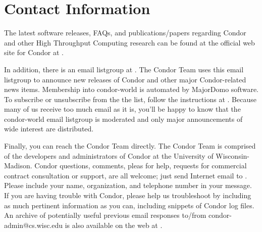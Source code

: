 

\section{\label{contact-info}Contact Information}

The latest software releases, FAQs, and publications/papers regarding Condor and other High 
Throughput Computing research can be found at the official web site for Condor at  
.

In addition, there is an email listgroup at .  The Condor Team 
uses this email listgroup to announce new releases of Condor and other major Condor-related 
news items.  Membership into condor-world is automated by MajorDomo software.  To 
subscribe or unsubscribe from the the list, follow the instructions at  
.  Because many of us receive 
too much email as it is, you'll be happy to know that the condor-world email listgroup is 
moderated and only major announcements of wide interest are distributed.

Finally, you can reach the Condor Team directly.  The Condor Team is comprised of the 
developers and administrators of Condor at the University of Wisconsin-Madison. Condor 
questions, comments, pleas for help, requests for commercial contract consultation or support, 
are all welcome; just send Internet email to .  Please include your 
name, organization, and telephone number in your message.  If you are having trouble with 
Condor, please help us troubleshoot by including as much pertinent information as you can, 
including snippets of Condor log files.  An archive of potentially useful previous email responses 
to/from condor-admin@cs.wisc.edu is also available on the web at  
.



